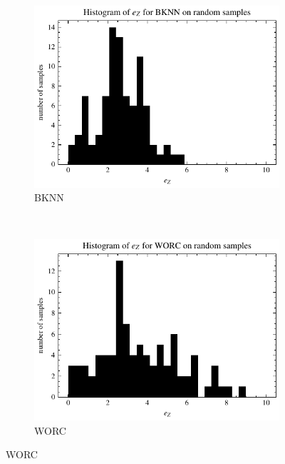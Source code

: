 \begin{figure}[ht]
    \centering
    \begin{subfigure}[t]{0.5\textwidth}
        \centering
        \includegraphics[width=\textwidth]{chapters/figures/result_histograms/result_histogram_random_sample_zone_sum_error_BKNN.pdf}
        \captionsetup{width=.9\linewidth}
        \caption{BKNN}
    \end{subfigure}%
    ~ 
    \begin{subfigure}[t]{0.5\textwidth}
        \centering
        \includegraphics[width=\textwidth]{chapters/figures/result_histograms/result_histogram_random_sample_zone_sum_error_WORC.pdf}
        \captionsetup{width=.9\linewidth}
        \caption{WORC}

\end{subfigure}
\end{figure}
